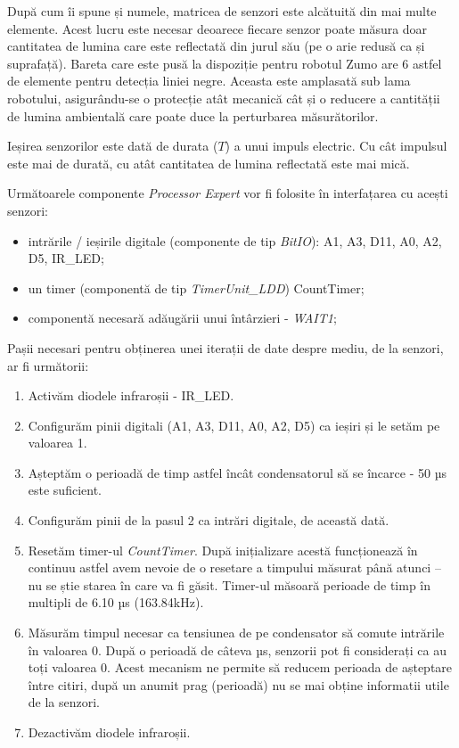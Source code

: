 După cum îi spune și numele, matricea de senzori este alcătuită din mai multe elemente. Acest lucru este necesar deoarece fiecare senzor poate măsura doar cantitatea de lumina care este reflectată din jurul său (pe o arie redusă ca și suprafață). Bareta care este pusă la dispoziție pentru robotul Zumo are 6 astfel de elemente pentru detecția liniei negre. Aceasta este amplasată sub lama robotului, asigurându-se o protecție atât mecanică cât și o reducere a cantității de lumina ambientală care poate duce la perturbarea măsurătorilor.

Ieșirea senzorilor este dată de durata ($T$) a unui impuls electric. Cu cât impulsul este mai de durată, cu atât cantitatea de lumina reflectată este mai mică.

Următoarele componente \textit{Processor Expert} vor fi folosite în interfațarea cu acești senzori:

\begin{itemize}
    \item intrările / ieșirile digitale (componente de tip \textit{BitIO}): A1, A3, D11, A0, A2, D5, IR\_LED;
    \item un timer (componentă de tip \textit{TimerUnit\_LDD}) CountTimer;
    \item componentă necesară adăugării unui întârzieri - \textit{WAIT1};
\end{itemize}

Pașii necesari pentru obținerea unei iterații de date despre mediu, de la senzori, ar fi următorii:

\begin{enumerate}
    \item Activăm diodele infraroșii - IR\_LED.
    \item Configurăm pinii digitali (A1, A3, D11, A0, A2, D5) ca ieșiri și le setăm pe valoarea 1.
    \item Așteptăm o perioadă de timp astfel încât condensatorul să se încarce - 50 µs este suficient.
    \item Configurăm pinii de la pasul 2 ca intrări digitale, de această dată.
    \item Resetăm timer-ul \textit{CountTimer}. După inițializare acestă funcționează în continuu astfel avem nevoie de o resetare a timpului măsurat până atunci – nu se știe starea în care va fi găsit. Timer-ul măsoară perioade de timp în multipli de 6.10 µs (163.84kHz).
    \item Măsurăm timpul necesar ca tensiunea de pe condensator să comute intrările în valoarea 0. După o perioadă de câteva µs, senzorii pot fi considerați ca au toți valoarea 0. Acest mecanism ne permite să reducem perioada de așteptare între citiri, după un anumit prag (perioadă) nu se mai obține informatii utile de la senzori.
    \item Dezactivăm diodele infraroșii.
\end{enumerate}